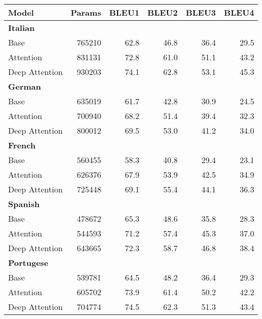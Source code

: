 \begin{tabular}{lrrrrr}
\hline
 \textbf{Model} & \textbf{Params} &  \textbf{BLEU1} &  \textbf{BLEU2} &  \textbf{BLEU3} &  \textbf{BLEU4} \\
\hline
{\textbf{Italian}} &         &        &        &        &        \\ 
           Base &  765210 &   62.8 &   46.8 &   36.4 &   29.5 \\
      Attention &  831131 &   72.8 &   61.0 &   51.1 &   43.2 \\
 Deep Attention &  930203 &   74.1 &   62.8 &   53.1 &   45.3 \\
\hline
{\textbf{German}} &         &        &        &        &        \\ 
           Base &  635019 &   61.7 &   42.8 &   30.9 &   24.5 \\
      Attention &  700940 &   68.2 &   51.4 &   39.4 &   32.3 \\
 Deep Attention &  800012 &   69.5 &   53.0 &   41.2 &   34.0 \\
\hline
{\textbf{French}} &         &        &        &        &        \\ 
           Base &  560455 &   58.3 &   40.8 &   29.4 &   23.1 \\
      Attention &  626376 &   67.9 &   53.9 &   42.5 &   34.9 \\
 Deep Attention &  725448 &   69.1 &   55.4 &   44.1 &   36.3 \\
\hline
{\textbf{Spanish}}&         &        &        &        &        \\ 
           Base &  478672 &   65.3 &   48.6 &   35.8 &   28.3 \\
      Attention &  544593 &   71.2 &   57.4 &   45.3 &   37.0 \\
 Deep Attention &  643665 &   72.3 &   58.7 &   46.8 &   38.4 \\
\hline
{\textbf{Portugese}}&         &        &        &        &        \\ 
           Base &  539781 &   64.5 &   48.2 &   36.4 &   29.3 \\
      Attention &  605702 &   73.9 &   61.4 &   50.2 &   42.2 \\
 Deep Attention &  704774 &   74.5 &   62.3 &   51.3 &   43.4 \\
\hline
\end{tabular}
